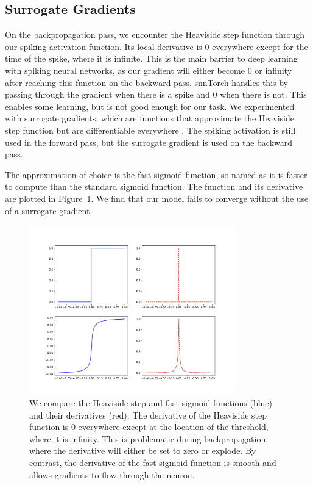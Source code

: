 \documentclass [MS] {UCLAthesis}
\begin{document}

\subsection{Surrogate Gradients}

On the backpropagation pass, we encounter the Heaviside step function through our spiking activation function. Its local derivative is 0 everywhere except for the time of the spike, where it is infinite. This is the main barrier to deep learning with spiking neural networks, as our gradient will either become 0 or infinity after reaching this function on the backward pass. snnTorch handles this by passing through the gradient when there is a spike and 0 when there is not. This enables some learning, but is not good enough for our task. We experimented with surrogate gradients, which are functions that approximate the Heaviside step function but are differentiable everywhere \citep{surrogate_grad}. The spiking activation is still used in the forward pass, but the surrogate gradient is used on the backward pass.


The approximation of choice is the fast sigmoid function, so named as it is faster to compute than the standard sigmoid function. The function and its derivative are plotted in Figure~\ref{fig:surrogate_grad}. We find that our model fails to converge without the use of a surrogate gradient.

\begin{figure}
    \centering
    \includegraphics[width=0.8\textwidth]{surrogate_grad}
    \caption[Derivatives of the Heaviside step and fast sigmoid functions]{We compare the Heaviside step and fast sigmoid functions (blue) and their derivatives (red). The derivative of the Heaviside step function is 0 everywhere except at the location of the threshold, where it is infinity. This is problematic during backpropagation, where the derivative will either be set to zero or explode. By contrast, the derivative of the fast sigmoid function is smooth and allows gradients to flow through the neuron. }
    \label{fig:surrogate_grad}
\end{figure}
\end{document}
